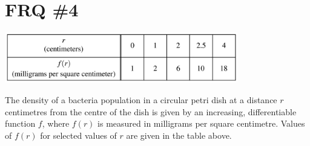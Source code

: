\documentclass[11pt,letterpaper]{article}
\begin{document}
\section*{FRQ \#4}
\begin{center}
    \includegraphics[width=4in]{table3.png}
\end{center}
The density of a bacteria population in a circular petri dish at a distance $r$ centimetres from the centre of the dish is given by an increasing, differentiable function $f$, where $f(r)$ is measured in milligrams per square centimetre. Values of $f(r)$ for selected values of $r$ are given in the table above.
\end{document}
